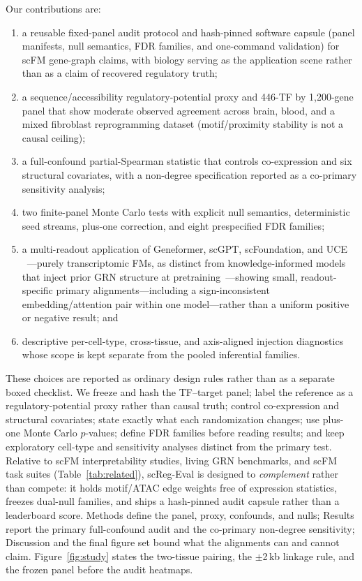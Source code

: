 \documentclass[fleqn,10pt,lineno]{wlpeerj}
\begin{document}
Our contributions are:
\begin{enumerate}
\item a reusable fixed-panel audit protocol and hash-pinned software capsule (panel manifests,
null semantics, FDR families, and one-command validation) for scFM gene-graph claims, with
biology serving as the application scene rather than as a claim of recovered regulatory truth;
\item a sequence/accessibility regulatory-potential proxy and 446-TF by 1,200-gene panel that show
moderate observed agreement across brain, blood, and a mixed fibroblast reprogramming dataset
(motif/proximity stability is not a causal ceiling);
\item a full-confound partial-Spearman statistic that controls co-expression and six structural
covariates, with a non-degree specification reported as a co-primary sensitivity analysis;
\item two finite-panel Monte Carlo tests with explicit null semantics, deterministic seed streams,
plus-one correction, and eight prespecified FDR families;
\item a multi-readout application of Geneformer, scGPT, scFoundation, and UCE
~\citep{theodoris2023geneformer,cui2024scgpt,hao2024scfoundation,rosen2023uce,yang2022scbert}---purely
transcriptomic FMs, as distinct from knowledge-informed models that inject prior GRN structure at
pretraining~\citep{yang2024genecompass,hu2026regformer}---showing small,
readout-specific primary alignments---including a sign-inconsistent embedding/attention pair within
one model---rather than a uniform positive or negative result; and
\item descriptive per-cell-type, cross-tissue, and axis-aligned injection diagnostics whose scope is
kept separate from the pooled inferential families.
\end{enumerate}

These choices are reported as ordinary design rules rather than as a separate boxed checklist.
We freeze and hash the TF--target panel; label the reference as a regulatory-potential proxy rather
than causal truth; control co-expression and structural covariates; state exactly what each
randomization changes; use plus-one Monte Carlo $p$-values; define FDR families before reading
results; and keep exploratory cell-type and sensitivity analyses distinct from the primary test.
Relative to scFM interpretability studies, living GRN benchmarks, and scFM task suites
(Table~\ref{tab:related}), scReg-Eval is designed to \emph{complement} rather than compete: it
holds motif/ATAC edge weights free of expression statistics, freezes dual-null families, and ships
a hash-pinned audit capsule rather than a leaderboard score.
Methods define the panel, proxy, confounds, and nulls; Results report the primary full-confound
audit and the co-primary non-degree sensitivity; Discussion and the final figure set bound what the
alignments can and cannot claim. Figure~\ref{fig:study} states the two-tissue pairing, the
$\pm$2\,kb linkage rule, and the frozen panel before the audit heatmaps.
\end{document}
